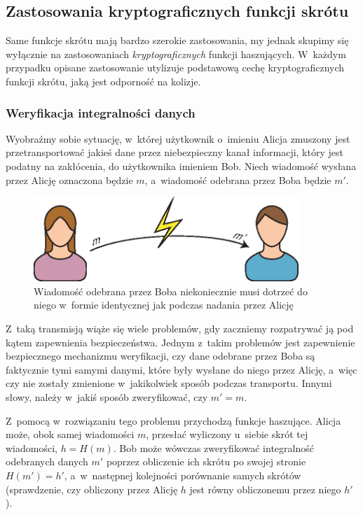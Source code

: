 \documentclass[12pt,a4paper,twoside]{article}
\begin{document}
\pagebreak



\subsection{Zastosowania kryptograficznych funkcji skrótu}
\label{sec:secure_hash_usages}
Same funkcje skrótu mają bardzo szerokie zastosowania, my jednak skupimy się
wyłącznie na zastosowaniach \emph{kryptograficznych} funkcji haszujących.
W~każdym przypadku opisane zastosowanie utylizuje podstawową cechę
kryptograficznych funkcji skrótu, jaką jest odporność na kolizje.



\subsubsection{Weryfikacja integralności danych}
\label{sec:usage_integrity_check}
Wyobraźmy sobie sytuację, w~której użytkownik o~imieniu Alicja zmuszony jest
przetransportować jakieś dane przez niebezpieczny kanał informacji, który jest
podatny na zakłócenia, do użytkownika imieniem Bob. Niech wiadomość wysłana
przez Alicję oznaczona będzie $m$, a~wiadomość odebrana przez Boba będzie $m'$.

\begin{figure}[htb!]
    \includegraphics[width=10cm]{img/usage1.eps}
    \caption{Wiadomość odebrana przez Boba niekoniecznie musi dotrzeć do niego
    w~formie identycznej jak podczas nadania przez Alicję}
    \label{fig:usage_integrity_check_1}
\end{figure}

Z~taką transmisją wiąże się wiele problemów, gdy zaczniemy rozpatrywać ją pod
kątem zapewnienia bezpieczeństwa. Jednym z~takim problemów jest zapewnienie
bezpiecznego mechanizmu weryfikacji, czy dane odebrane przez Boba są faktycznie
tymi samymi danymi, które były wysłane do niego przez Alicję, a~więc czy nie
zostały zmienione w~jakikolwiek sposób podczas transportu. Innymi słowy, należy
w~jakiś sposób zweryfikować, czy $m' = m$.

Z~pomocą w~rozwiązaniu tego problemu przychodzą funkcje haszujące. Alicja może,
obok samej wiadomości $m$, przesłać wyliczony u~siebie skrót tej wiadomości,
$h=H(m)$. Bob może wówczas zweryfikować integralność odebranych danych $m'$
poprzez obliczenie ich skrótu po swojej stronie $H(m')=h'$, a~w~następnej
kolejności porównanie samych skrótów (sprawdzenie, czy obliczony przez Alicję
$h$ jest równy obliczonemu przez niego $h'$).
\end{document}
